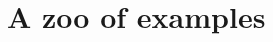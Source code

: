 \documentclass{article}
\theoremstyle{definition}
\newtheorem{rem}[thm]{Remark}
\newcommand{\Z}{\mathbb{Z}}
\newcommand{\tee}{\mathfrak{t}}
\newcommand{\lex}{\times_{\textnormal{lex}}}
\begin{document}
%
%
%

\section{A zoo of examples}
\end{document}
